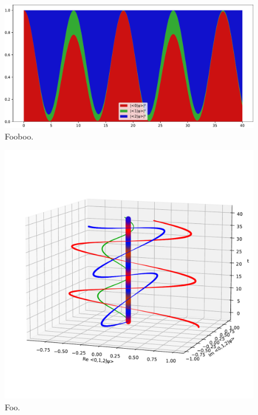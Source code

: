 \begin{figure}
  \includegraphics[width=\textwidth]{img/3ldetect/hermitian3color.pdf}
  \caption{Fooboo.}
\end{figure}

\begin{figure}
  \includegraphics[width=\textwidth]{img/3ldetect/hermitianSpaceTime_side.pdf}
  \caption{Foo.}
\end{figure}


